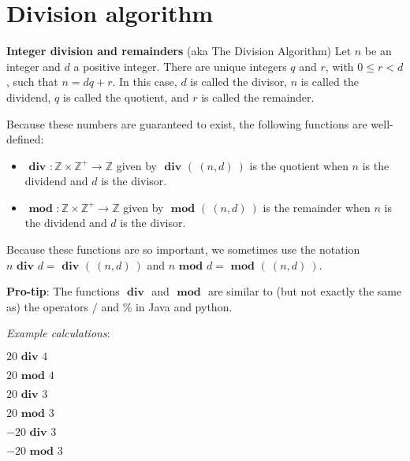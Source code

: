 \documentclass[12pt, oneside]{article}
\begin{document}
\begin{flushright}
\end{flushright} \section*{Division algorithm}


{\bf Integer division and remainders} (aka The Division Algorithm) Let $n$ be an integer 
and $d$ a positive integer. There are unique integers $q$ and $r$, with $0 \leq r < d$, such that 
$n = dq + r$. In this case, $d$ is called the divisor, $n$ is called the dividend, 
$q$ is called the quotient, 
and $r$ is called the remainder. 

Because these numbers are guaranteed to exist, the following functions are well-defined: 
\begin{itemize}\setlength{\leftmargin}{-0.25in}
\item $\textbf{ div } : \mathbb{Z} \times \mathbb{Z}^+ \to \mathbb{Z}$ given by $\textbf{ div } ( ~(n,d)~)$ 
is the quotient when $n$ is the dividend and $d$ is the divisor.
\item $\textbf{ mod } : \mathbb{Z} \times \mathbb{Z}^+ \to \mathbb{Z}$ given by $\textbf{ mod } ( ~(n,d)~)$ 
is the remainder when $n$ is the dividend and $d$ is the divisor.
\end{itemize}
Because these functions are so important, we sometimes use the notation
$n \textbf{ div } d = \textbf{ div } ( ~(n,d)~)$ and $n \textbf{ mod } d = \textbf{ mod } (~(n,d)~)$.


{\bf Pro-tip}: The functions $\textbf{ div }$ and $\textbf{ mod }$ are similar to (but not exactly the same as) 
the operators $/$ and $\%$ in Java and python.

\vfill

{\it Example calculations}:

$20 \textbf{ div } 4$

\vspace{20pt}

$20 \textbf{ mod } 4$

\vspace{20pt}

$20 \textbf{ div } 3$

\vspace{20pt}

$20 \textbf{ mod } 3$

\vspace{20pt}

$-20 \textbf{ div } 3$

\vspace{20pt}

$-20 \textbf{ mod } 3$

\vfill \vfill
\end{document}
